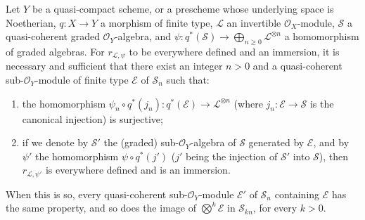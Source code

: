 \begin{proposition}[3.8.5]
\label{II.3.8.5}
Let $Y$ be a quasi-compact scheme, or a prescheme whose underlying space
is Noetherian, $q:X\to Y$ a morphism of finite type, $\mathcal{L}$ an
invertible $\mathcal{O}_X$-module, $\mathcal{S}$ a quasi-coherent graded
$\mathcal{O}_Y$-algebra, and
$\psi:q^*(\mathcal{S})\to\bigoplus_{n\geq0}\mathcal{L}^{\otimes n}$ a
homomorphism of graded algebras. For $r_{\mathcal{L},\psi}$ to be
everywhere defined and an immersion, it is necessary and sufficient that
there exist an integer $n>0$ and a quasi-coherent sub-$\mathcal{O}_Y$-module of
finite type $\mathcal{E}$ of $\mathcal{S}_n$ such that:
\begin{enumerate}
  \item[a)] the homomorphism
    $\psi_n\circ q^*(j_n):q^*(\mathcal{E})\to\mathcal{L}^{\otimes n}$
    (where $j_n:\mathcal{E}\to\mathcal{S}$ is the canonical injection) is
    surjective;
  \item[b)] if we denote by $\mathcal{S}'$ the (graded)
    sub-$\mathcal{O}_Y$-algebra of $\mathcal{S}$ generated by $\mathcal{E}$, and
    by $\psi'$ the homomorphism $\psi\circ q^*(j')$ ($j'$ being the injection
    of $\mathcal{S}'$ into $\mathcal{S}$), then $r_{\mathcal{L},\psi'}$ is
    everywhere defined and is an immersion.
\end{enumerate}

When this is so, every quasi-coherent sub-$\mathcal{O}_Y$-module
$\mathcal{E}'$ of $\mathcal{S}_n$ containing $\mathcal{E}$ has the same
property, and so does the image of $\bigotimes^k\mathcal{E}$ in
$\mathcal{S}_{kn}$, for every $k>0$.
\end{proposition}

